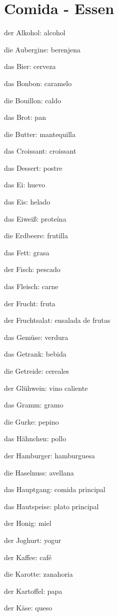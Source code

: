 \section{Comida - Essen}
\begin{multicols}{2}
\begin{myitemize}
\item der Alkohol: alcohol
\item die Aubergine: berenjena
\item das Bier: cerveza
\item das Bonbon: caramelo
\item die Bouillon: caldo
\item das Brot: pan
\item die Butter: mantequilla
\item das Croissant: croissant
\item das Dessert: postre
\item das Ei: huevo
\item das Eis: helado
\item das Eiweiß: proteína
\item die Erdbeere: frutilla
\item das Fett: grasa
\item der Fisch: pescado
\item das Fleisch: carne 
\item der Frucht: fruta
\item der Fruchtsalat: ensalada de frutas
\item das Gemüse: verdura
\item das Getrank: bebida
\item die Getreide: cereales
\item der Glühwein: vino caliente
\item das Gramm: gramo
\item die Gurke: pepino
\item das Hähnchen: pollo
\item der Hamburger: hamburguesa
\item die Haselnuss: avellana
\item das Hauptgang: comida principal
\item das Hautspeise: plato principal
\item der Honig: miel
\item der Joghurt: yogur
\item der Kaffee: café
\item die Karotte: zanahoria
\item der Kartoffel: papa
\item der Käse: queso

\end{myitemize}
\end{multicols}

